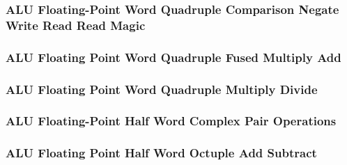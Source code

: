 \subsubsection[{\small ALU Floating-Point Word Quadruple Comparison Negate Write Read Read Magic}]{ALU Floating-Point Word Quadruple Comparison Negate Write Read Read Magic} \label{sec:format-ALU-FWQCNWRR.M}



\subsubsection[{\small ALU Floating Point Word Quadruple Fused Multiply Add}]{ALU Floating Point Word Quadruple Fused Multiply Add} \label{sec:format-ALU-FWQFMA}



\subsubsection[{\small ALU Floating Point Word Quadruple Multiply Divide}]{ALU Floating Point Word Quadruple Multiply Divide} \label{sec:format-ALU-FWQMUL}



\subsubsection[{\small ALU Floating-Point Half Word Complex Pair Operations}]{ALU Floating-Point Half Word Complex Pair Operations} \label{sec:format-ALU-FHCPOP}



\subsubsection[{\small ALU Floating Point Half Word Octuple Add Subtract}]{ALU Floating Point Half Word Octuple Add Subtract} \label{sec:format-ALU-FHOADD}



